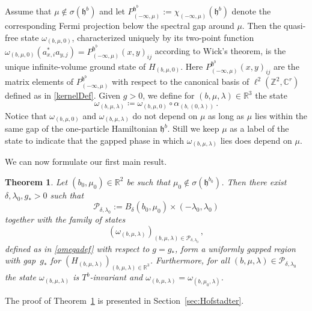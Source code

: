 \documentclass[a4paper]{article}
\newcommand{\fd}{r}
\newcommand{\w}{\omega}
\newcommand{\Z}{\mathbb{Z}}
\newcommand{\C}{\mathbb{C}}
\newcommand{\R}{\mathbb{R}}
\theoremstyle{plain}
\newtheorem{theorem}{Theorem}[section]
\theoremstyle{definition}
\theoremstyle{remark}
\renewcommand{\(}{\left(}
\renewcommand{\)}{\right)}
\begin{document}
Assume that $\mu\notin\sigma(\mathfrak{h}^{b})$ and let $P_{(-\infty,\mu)}^{\mathfrak{h}^b} := \chi_{(-\infty,\mu)}(\mathfrak{h}^b)$ denote the corresponding Fermi projection below the spectral gap around $\mu$. 
Then the quasi-free state $\w_{(b,\mu,0)}$, characterized uniquely by its two-point function 
$\w_{(b,\mu,0)}(a^*_{x,i}a_{y,j}) = P_{(-\infty,\mu)}^{\mathfrak{h}^b}(x,y)_{ij}$ according to Wick's theorem, is the  unique infinite-volume ground state of  $H_{(b,\mu,0)}$. Here  $P_{(-\infty,\mu)}^{\mathfrak{h}^b}(x,y)_{ij}$ are the matrix elements of $P_{(-\infty,\mu)}^{\mathfrak{h}^b}$ with respect to the canonical basis of $\ell^2(\Z^2,\C^\fd)$ defined as in \eqref{kernelDef}. 
 Given $g>0$, we define for $(b,\mu,\lambda)\in \R^3$  the state 
\begin{equation}\label{omegadef}
\w_{(b,\mu,\lambda)} \coloneq \w_{(b,\mu,0)} \circ \alpha_{(b,(0, \lambda))}\,.
\end{equation}
Notice that $\w_{(b,\mu,0)}$ and $\w_{(b,\mu,\lambda)}$ do not depend on $\mu$ as long as $\mu$ lies within the same gap of the one-particle Hamiltonian $\mathfrak{h}^{b}$. Still we keep $\mu$ as a label of the state to indicate that the gapped phase in which $\w_{(b,\mu,\lambda)} $ lies does depend on $\mu$.

We can now formulate our first main result. 

\begin{theorem}\label{prop:Hofstadter}
    Let $(b_0,\mu_0)\in\R^2$ be such that $\mu_0\notin\sigma(\mathfrak{h}^{b_0})$. Then there exist $\delta,\lambda_0,g_*>0$   such that 
    \[\mathcal{P}_{\delta,\lambda_0} := B_{\delta}(b_0,\mu_0)\times (-\lambda_0,\lambda_0)\] 
    together with the family of states 
    \[(\w_{(b,\mu,\lambda)})_{(b,\mu,\lambda) \in \mathcal{P}_{\delta,\lambda_0}}\,,\] 
    defined as in \eqref{omegadef} with respect to $g=g_*$,
    form a uniformly gapped region with gap~$g_*$ for $(H_{(b,\mu,\lambda)})_{(b,\mu,\lambda)\in \R^3}$. Furthermore, for all $(b,\mu,\lambda)\in \mathcal{P}_{\delta,\lambda_0}$ the state $\w_{(b,\mu,\lambda)}$ is $T^{b}$-invariant and   $\w_{(b,\mu,\lambda)} = \w_{(b,\mu_0,\lambda)}$.
\end{theorem}   
\noindent The proof of Theorem~\ref{prop:Hofstadter} is presented in Section~\ref{sec:Hofstadter}.

 








\smallskip
\end{document}
